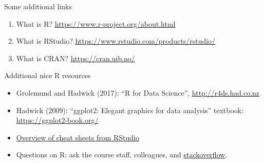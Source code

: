 \documentclass[
  10pt,
  ignorenonframetext,
]{beamer}
\providecommand{\tightlist}{%
  \setlength{\itemsep}{0pt}\setlength{\parskip}{0pt}}
\begin{document}
\begin{frame}
\begin{block}{Some additional links}
\protect\hypertarget{some-additional-links}{}
\vspace{4mm}

\begin{enumerate}
[1)]
\item
  What is R? \url{https://www.r-project.org/about.html} \vspace{2mm}
\item
  What is RStudio? \url{https://www.rstudio.com/products/rstudio/}
  \vspace{2mm}
\item
  What is CRAN? \url{https://cran.uib.no/} \vspace{2mm}
\end{enumerate}
\end{block}
\end{frame}

\begin{frame}
\begin{block}{Additional nice R resources}
\protect\hypertarget{additional-nice-r-resources}{}
\(~\)

\begin{itemize}
\tightlist
\item
  Grolemund and Hadwick (2017): ``R for Data Science'',
  \url{http://r4ds.had.co.nz}
\end{itemize}

\vspace{2mm}

\begin{itemize}
\tightlist
\item
  Hadwick (2009): ``ggplot2: Elegant graphics for data analysis''
  textbook: \url{https://ggplot2-book.org/}
\end{itemize}

\vspace{2mm}

\begin{itemize}
\tightlist
\item
  \href{https://www.rstudio.com/resources/cheatsheets/}{Overview of
  cheat sheets from RStudio}
\end{itemize}

\vspace{2mm}

\begin{itemize}
\tightlist
\item
  Questions on R: ask the course staff, colleagues, and
  \href{https://stackoverflow.com/}{stackoverflow}.
\end{itemize}
\end{block}
\end{frame}
\end{document}

